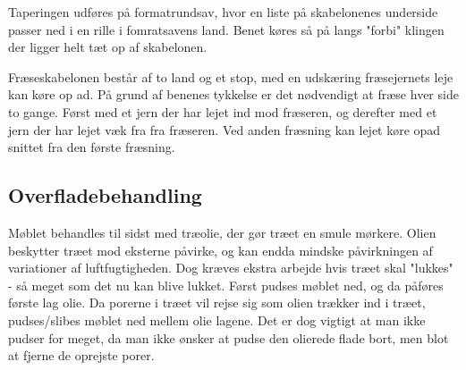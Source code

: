 Taperingen udføres på formatrundsav, hvor en liste på skabelonenes underside
passer ned i en rille i fomratsavens land. Benet køres så på langs "forbi"
klingen der ligger helt tæt op af skabelonen.

Fræseskabelonen består af to land og et stop, med en udskæring fræsejernets leje kan køre
op ad. På grund af benenes tykkelse er det nødvendigt at fræse hver side to
gange. Først med et jern der har lejet ind mod fræseren, og derefter med et jern
der har lejet væk fra fra fræseren. Ved anden fræsning kan lejet køre opad
snittet fra den første fræsning.

\subsection*{Overfladebehandling}
Møblet behandles til sidst med træolie, der gør træet en smule mørkere.
Olien beskytter træet mod eksterne påvirke, og kan endda mindske påvirkningen af
variationer af luftfugtigheden. Dog kræves ekstra arbejde hvis træet skal
"lukkes" - så meget som det nu kan blive lukket.
Først pudses møblet ned, og da påføres første lag olie. Da porerne i træet vil
rejse sig som olien trækker ind i træet, pudses/slibes møblet ned mellem olie
lagene. Det er dog vigtigt at man ikke pudser for meget, da man ikke ønsker at
pudse den olierede flade bort, men blot at fjerne de oprejste porer.
